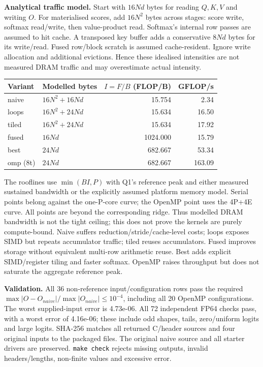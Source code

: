 \documentclass[10pt,a4paper]{article}
\newcommand{\question}[1]{\vspace{1mm}{\large\bfseries #1}\par\vspace{1mm}}
\begin{document}
\textbf{Analytical traffic model.} Start with $16Nd$ bytes for reading $Q,K,V$ and writing $O$.
For materialised scores, add $16N^2$ bytes across stages: score write, softmax read/write,
then value-product read. Softmax's internal row passes are assumed to hit cache. A transposed
key buffer adds a conservative $8Nd$ bytes for its write/read. Fused row/block scratch is
assumed cache-resident. Ignore write allocation and additional evictions. Hence these
idealised intensities are not measured DRAM traffic and may overestimate actual intensity.
\begin{center}
\footnotesize
\begin{tabular}{llrr}
\toprule
Variant & Modelled bytes & $I=F/B$ (FLOP/B) & GFLOP/s \\
\midrule
naive & $16N^2+16Nd$ & 15.754 & 2.34 \\
loops & $16N^2+24Nd$ & 15.634 & 16.50 \\
tiled & $16N^2+24Nd$ & 15.634 & 17.92 \\
fused & $16Nd$ & 1024.000 & 15.79 \\
best & $24Nd$ & 682.667 & 53.34 \\
omp (8t) & $24Nd$ & 682.667 & 163.09 \\
\bottomrule
\end{tabular}
\end{center}

The rooflines use $\min(BI,P)$ with Q1's reference peak and either measured sustained bandwidth
or the explicitly assumed platform memory model. Serial points belong against the one-P-core
curve; the OpenMP point uses the 4P+4E curve. All points are beyond the corresponding ridge.
Thus modelled DRAM bandwidth is not the tight ceiling; this does not prove the kernels are
purely compute-bound. Naive suffers reduction/stride/cache-level costs; loops exposes SIMD
but repeats accumulator traffic; tiled reuses accumulators. Fused improves storage without
equivalent multi-row arithmetic reuse. Best adds explicit SIMD/register tiling and faster
softmax. OpenMP raises throughput but does not saturate the aggregate reference peak.
\newpage
\question{Validation, auxiliary measurements and reproduction}

\textbf{Validation.} All 36 non-reference input/configuration rows pass the required
$\max|O-O_{naive}|/\max|O_{naive}|\le10^{-4}$, including all 20 OpenMP configurations.
The worst supplied-input error is 4.73e-06. All 72 independent FP64 checks pass, with a
worst error of 4.16e-06; these include odd shapes, tails, zero/uniform logits and large logits.
SHA-256 matches all returned C/header sources and four original inputs to the packaged files.
The original naive source and all starter drivers are preserved. \texttt{make check} rejects
missing outputs, invalid headers/lengths, non-finite values and excessive error.
\end{document}
